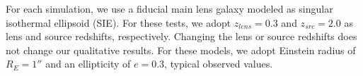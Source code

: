For each simulation, we use a fiducial main lens galaxy modeled as singular isothermal ellipsoid (SIE). For these tests, we adopt $z_{lens} = 0.3$ and $z_{src} = 2.0$ as lens and source redshifts, respectively. Changing the lens or source redshifts does not change our qualitative results. For these models, we adopt Einstein radius of $R_E = 1''$ and an ellipticity of $e =0.3$, typical observed values.
  
